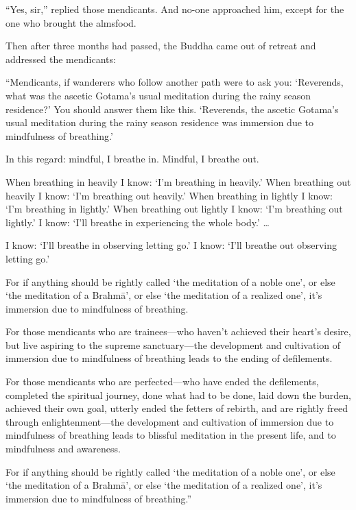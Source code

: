 \documentclass[12pt,openany]{book}%
\begin{document}
“Yes, sir,” replied those mendicants. And no-one approached him, except for the one who brought the almsfood. 

Then after three months had passed, the Buddha came out of retreat and addressed the mendicants: 

“Mendicants, if wanderers who follow another path were to ask you: ‘Reverends, what was the ascetic Gotama’s usual meditation during the rainy season residence?’ You should answer them like this. ‘Reverends, the ascetic Gotama’s usual meditation during the rainy season residence was immersion due to mindfulness of breathing.’ 

In this regard: mindful, I breathe in. Mindful, I breathe out. 

When breathing in heavily I know: ‘I’m breathing in heavily.’ When breathing out heavily I know: ‘I’m breathing out heavily.’ When breathing in lightly I know: ‘I’m breathing in lightly.’ When breathing out lightly I know: ‘I’m breathing out lightly.’ I know: ‘I’ll breathe in experiencing the whole body.’ … 

I know: ‘I’ll breathe in observing letting go.’ I know: ‘I’ll breathe out observing letting go.’ 

For if anything should be rightly called ‘the meditation of a noble one’, or else ‘the meditation of a \textsanskrit{Brahmā}’, or else ‘the meditation of a realized one’, it’s immersion due to mindfulness of breathing. 

For those mendicants who are trainees—who haven’t achieved their heart’s desire, but live aspiring to the supreme sanctuary—the development and cultivation of immersion due to mindfulness of breathing leads to the ending of defilements. 

For those mendicants who are perfected—who have ended the defilements, completed the spiritual journey, done what had to be done, laid down the burden, achieved their own goal, utterly ended the fetters of rebirth, and are rightly freed through enlightenment—the development and cultivation of immersion due to mindfulness of breathing leads to blissful meditation in the present life, and to mindfulness and awareness. 

For if anything should be rightly called ‘the meditation of a noble one’, or else ‘the meditation of a \textsanskrit{Brahmā}’, or else ‘the meditation of a realized one’, it’s immersion due to mindfulness of breathing.” 
\end{document}
